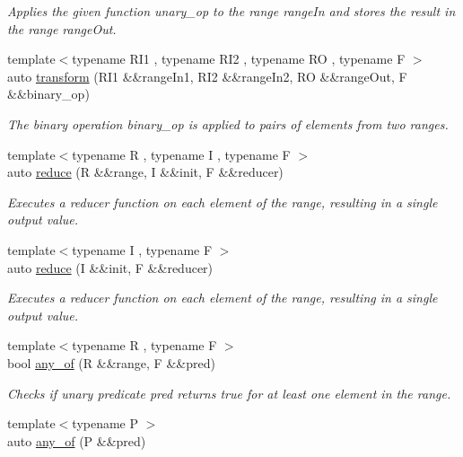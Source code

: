 \begin{DoxyCompactItemize}
\begin{DoxyCompactList}\small\item\em Applies the given function unary\+\_\+op to the range range\+In and stores the result in the range range\+Out. \end{DoxyCompactList}\item 
{\footnotesize template$<$typename R\+I1 , typename R\+I2 , typename RO , typename F $>$ }\\auto \mbox{\hyperlink{namespacerah_a7bac191e66e0d3f3823e0c08382f0418}{transform}} (R\+I1 \&\&range\+In1, R\+I2 \&\&range\+In2, RO \&\&range\+Out, F \&\&binary\+\_\+op)
\begin{DoxyCompactList}\small\item\em The binary operation binary\+\_\+op is applied to pairs of elements from two ranges. \end{DoxyCompactList}\item 
{\footnotesize template$<$typename R , typename I , typename F $>$ }\\auto \mbox{\hyperlink{namespacerah_a407b50a4f029e3f2a3cd0ba9142aea84}{reduce}} (R \&\&range, I \&\&init, F \&\&reducer)
\begin{DoxyCompactList}\small\item\em Executes a reducer function on each element of the range, resulting in a single output value. \end{DoxyCompactList}\item 
{\footnotesize template$<$typename I , typename F $>$ }\\auto \mbox{\hyperlink{namespacerah_a6a6b7b7e3b78bb4bd16372fbb688c152}{reduce}} (I \&\&init, F \&\&reducer)
\begin{DoxyCompactList}\small\item\em Executes a reducer function on each element of the range, resulting in a single output value. \end{DoxyCompactList}\item 
{\footnotesize template$<$typename R , typename F $>$ }\\bool \mbox{\hyperlink{namespacerah_a836c57da2bd108c491f3ba96786f6aa4}{any\+\_\+of}} (R \&\&range, F \&\&pred)
\begin{DoxyCompactList}\small\item\em Checks if unary predicate pred returns true for at least one element in the range. \end{DoxyCompactList}\item 
{\footnotesize template$<$typename P $>$ }\\auto \mbox{\hyperlink{namespacerah_aa3f330b2354859d8a9e6df794a1e7a1a}{any\+\_\+of}} (P \&\&pred)

\end{DoxyCompactItemize}
